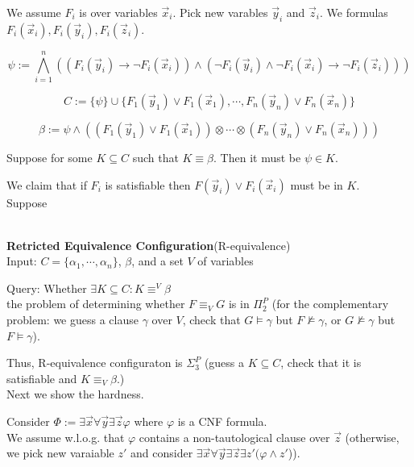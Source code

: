 \documentclass[12pt]{article}
\begin{document}
We assume $F_i$ is over variables $\vec{x}_i$. Pick new varables $\vec{y}_i$ and $\vec{z}_i$. We formulas $F_i(\vec{x}_i), F_i(\vec{y}_i), F_i(\vec{z}_i)$.

$$\psi:=\bigwedge_{i=1}^n \left((F_i(\vec{y}_i)\rightarrow \neg F_i(\vec{x}_i))\wedge (\neg F_i(\vec{y}_i)\wedge \neg F_i(\vec{x}_i)\rightarrow \neg F_i(\vec{z}_i))\right)$$



$$C:=\{\psi\}\cup \{F_1(\vec{y}_1)\vee F_1(\vec{x}_1),\cdots, F_n(\vec{y}_n)\vee F_n(\vec{x}_n)\}$$

$$\beta:=\psi\wedge ((F_1(\vec{y}_1)\vee F_1(\vec{x}_1))\otimes\cdots\otimes (F_n(\vec{y}_n)\vee F_n(\vec{x}_n)))$$


Suppose for some $K\subseteq C$ such that $K\equiv \beta$. Then it must be $\psi\in K$. 

We claim that if $F_i$ is satisfiable then $F(\vec{y}_i)\vee F_i(\vec{x}_i)$ must be in $K$.\\


Suppose 





\ \\

{\bf Retricted Equivalence Configuration}(R-equivalence)\\

Input: $C=\{\alpha_1,\cdots,\alpha_n\}$, $\beta$, and a set $V$ of variables

Query: Whether $\exists K\subseteq C: K\equiv^V \beta$\\ 



the problem of determining whether $F\equiv_V G$  is in $\Pi_2^P$ (for the complementary problem: we guess a clause $\gamma$ over $V$, check that $G\models \gamma$ but $F\not\models \gamma$, or $G\not\models\gamma$ but $F\models\gamma$). 

Thus, R-equivalence configuraton is $\Sigma_3^P$ (guess a $K\subseteq C$, check that it is satisfiable and $K\equiv_V \beta$.) \\


Next we show the hardness.

Consider $\Phi:=\exists \vec{x}\forall\vec{y}\exists \vec{z} \varphi$ where $\varphi$ is a CNF formula. \\

We assume w.l.o.g. that $\varphi$ contains a non-tautological clause over $\vec{z}$ (otherwise, we pick new varaiable $z'$ and consider $\exists\vec{x}\forall\vec{y}\exists\vec{z}\exists z'(\varphi\wedge z'$)).
\end{document}
